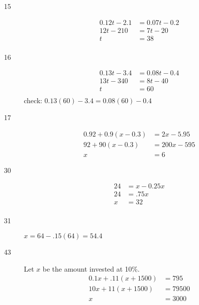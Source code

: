 \documentclass[letterpaper]{exam}
\begin{document}
    \begin{description}
      \item[15]
        \begin{align*}
          0.12t - 2.1 & = 0.07t - 0.2 \\
          12t - 210   & = 7t - 20 \\
          t           & = \boxed{ 38 } \\
        \end{align*}

      \item[16]
        \begin{align*}
          0.13t - 3.4      & = 0.08t - 0.4 \\
          13t - 340        & = 8t - 40 \\
          t                & = \boxed{ 60 } \\
        \end{align*}
      check: \( 0.13(60) - 3.4  = 0.08(60) - 0.4 \)

      \item[17]
        \begin{align*}
          0.92 + 0.9(x - 0.3)      & = 2x - 5.95 \\
          92 + 90(x - 0.3)         & = 200x - 595 \\
          x                        & = \boxed{ 6 }
        \end{align*}

      \item[30]
        \begin{align*}
          24 & = x - 0.25x \\
          24 & = .75x \\
          x  & = \boxed{ 32 } \\
        \end{align*}

      \item[31] $x = 64 - .15(64) = 54.4$

      \item[43] Let $x$ be the amount invested at 10\%.
        \begin{align*}
          0.1x + .11(x + 1500) & = 795 \\
          10x + 11(x + 1500)   & = 79500 \\
          x                    & = \boxed{ 3000 } \\
        \end{align*}

      \end{description}
      
\end{document}
